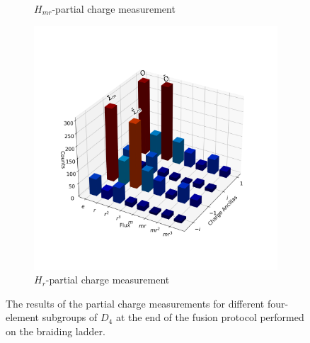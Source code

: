 \documentclass[a4paper,twocolumn,11pt, accepted=2024-06-14]{quantumarticle}
\begin{document}
\begin{figure}
\begin{subfigure}{0.49\linewidth}
        \caption{$H_{mr}$-partial charge measurement}
        \label{fig:glasses_Hmr}
    \end{subfigure}
    \begin{subfigure}{0.5\linewidth}
        \centering
        \includegraphics[width=\linewidth]{Figures/glasses_r.png}
        \caption{$H_r$-partial charge measurement}
        \label{fig:glasses_Hr}
    \end{subfigure}
    \caption{The results of the partial charge measurements for different four-element subgroups of $D_4$ at the end of the fusion protocol performed on the braiding ladder.}
    \label{fig:glasses_all_subs}
\end{figure}
\end{document}
